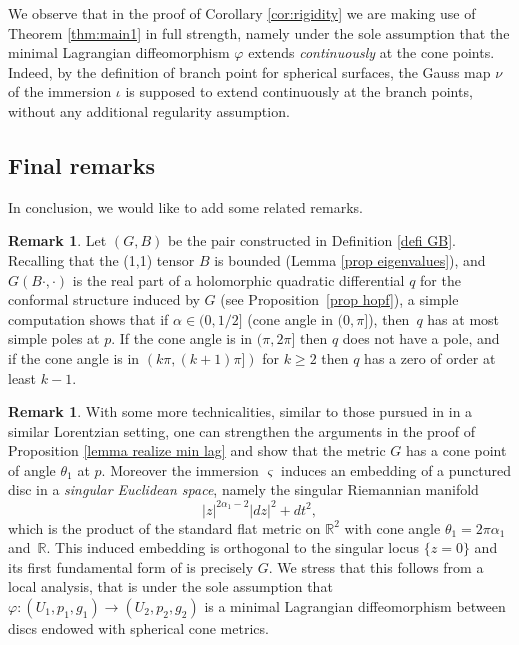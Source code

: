 \documentclass[JEP,XML,SOM,Unicode,NoEqCountersInSection,published]{cedram}
\theoremstyle{definition}
\newtheorem{remark}[cor]{Remark}
\newcommand{\R}{{\mathbb R}}
\begin{document}
We observe that in the proof of Corollary \ref{cor:rigidity} we are making use of Theorem \ref{thm:main1} in full strength, namely under the sole assumption that the minimal Lagrangian diffeomorphism $\varphi$ extends \emph{continuously} at the cone points. Indeed, by the definition of branch point for spherical surfaces, the Gauss map $\nu$ of the immersion $\iota$ is supposed to extend {continuously} at the branch points, without any additional regularity assumption.

\subsection{Final remarks}
In conclusion, we would like to add some related remarks.

\begin{remark}
Let $(G,B)$ be the pair constructed in Definition \ref{defi GB}. Recalling that the (1,1) tensor $B$ is bounded (Lemma \ref{prop eigenvalues}), and $G(B\cdot,\cdot)$ is the real part of a holomorphic quadratic differential $q$ for the conformal structure induced by $G$ (see Proposition~\ref{prop hopf}), a simple computation shows that if $\alpha\in (0,1/2]$ (\ie cone angle in $(0,\pi]$), then~$q$ has at most simple poles at $p$. If the cone angle is in $(\pi,2\pi]$ then $q$ does not have a pole, and if the cone angle is in $(k\pi,(k+1)\pi])$ for $k\geq 2$ then $q$ has a zero of order at least $k-1$.
\end{remark}

\begin{remark}\label{rmk same cone angles}
With some more technicalities, similar to those pursued in \hbox{\cite[\S 4]{zbMATH06561539}} in a similar Lorentzian setting, one can strengthen the arguments in the proof of Proposition \ref{lemma realize min lag} and show that the metric $G$ has a cone point of angle $\theta_1$ at $p$. Moreover the immersion $\varsigma$ induces an embedding of a punctured disc in a \emph{singular Euclidean space}, namely the singular Riemannian manifold
\[
|z|^{2\alpha_1-2}|dz|^2+dt^2,
\]
which is the product of the standard flat metric on $\R^2$ with cone angle $\theta_1=2\pi\alpha_1$ and~$\R$. This induced embedding is orthogonal to the singular locus $\{z=0\}$ and its first fundamental form of is precisely $G$.
We stress that this follows from a local analysis, that is under the sole assumption that $\varphi:(U_1,p_1,g_1)\to (U_2,p_2,g_2)$ is a minimal Lagrangian diffeomorphism between discs endowed with spherical cone metrics.
\end{remark}
\end{document}
